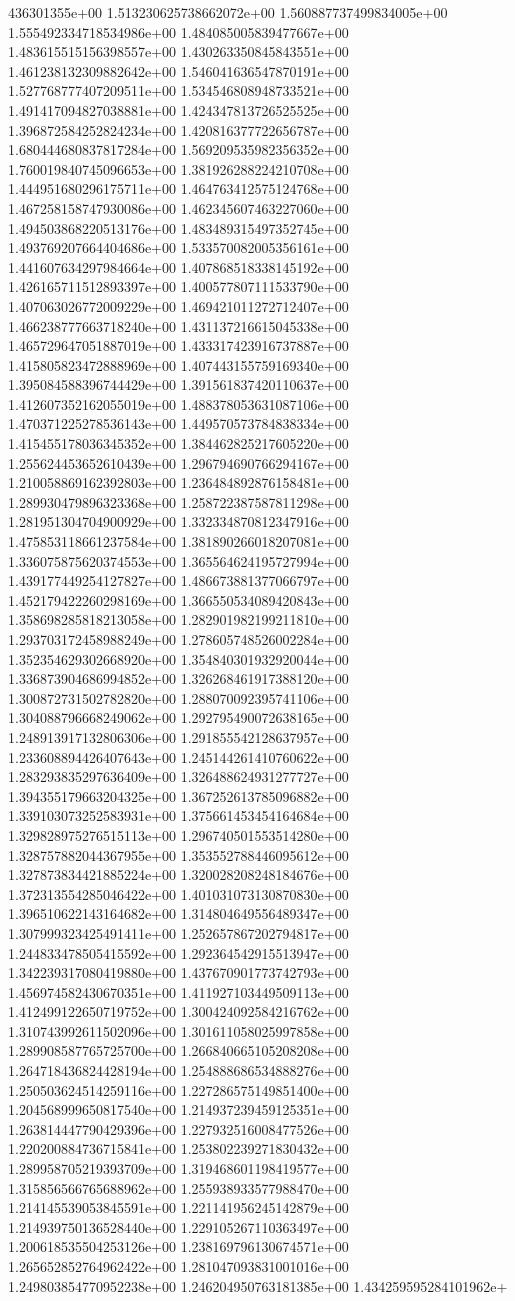 436301355e+00	1.513230625738662072e+00	1.560887737499834005e+00	1.555492334718534986e+00	1.484085005839477667e+00	1.483615515156398557e+00	1.430263350845843551e+00	1.461238132309882642e+00	1.546041636547870191e+00	1.527768777407209511e+00	1.534546808948733521e+00	1.491417094827038881e+00	1.424347813726525525e+00	1.396872584252824234e+00	1.420816377722656787e+00	1.680444680837817284e+00	1.569209535982356352e+00	1.760019840745096653e+00	1.381926288224210708e+00	1.444951680296175711e+00	1.464763412575124768e+00	1.467258158747930086e+00	1.462345607463227060e+00	1.494503868220513176e+00	1.483489315497352745e+00	1.493769207664404686e+00	1.533570082005356161e+00	1.441607634297984664e+00	1.407868518338145192e+00	1.426165711512893397e+00	1.400577807111533790e+00	1.407063026772009229e+00	1.469421011272712407e+00	1.466238777663718240e+00	1.431137216615045338e+00	1.465729647051887019e+00	1.433317423916737887e+00	1.415805823472888969e+00	1.407443155759169340e+00	1.395084588396744429e+00	1.391561837420110637e+00	1.412607352162055019e+00	1.488378053631087106e+00	1.470371225278536143e+00	1.449570573784838334e+00	1.415455178036345352e+00	1.384462825217605220e+00	1.255624453652610439e+00	1.296794690766294167e+00	1.210058869162392803e+00	1.236484892876158481e+00	1.289930479896323368e+00	1.258722387587811298e+00	1.281951304704900929e+00	1.332334870812347916e+00	1.475853118661237584e+00	1.381890266018207081e+00	1.336075875620374553e+00	1.365564624195727994e+00	1.439177449254127827e+00	1.486673881377066797e+00	1.452179422260298169e+00	1.366550534089420843e+00	1.358698285818213058e+00	1.282901982199211810e+00	1.293703172458988249e+00	1.278605748526002284e+00	1.352354629302668920e+00	1.354840301932920044e+00	1.336873904686994852e+00	1.326268461917388120e+00	1.300872731502782820e+00	1.288070092395741106e+00	1.304088796668249062e+00	1.292795490072638165e+00	1.248913917132806306e+00	1.291855542128637957e+00	1.233608894426407643e+00	1.245144261410760622e+00	1.283293835297636409e+00	1.326488624931277727e+00	1.394355179663204325e+00	1.367252613785096882e+00	1.339103073252583931e+00	1.375661453454164684e+00	1.329828975276515113e+00	1.296740501553514280e+00	1.328757882044367955e+00	1.353552788446095612e+00	1.327873834421885224e+00	1.320028208248184676e+00	1.372313554285046422e+00	1.401031073130870830e+00	1.396510622143164682e+00	1.314804649556489347e+00	1.307999323425491411e+00	1.252657867202794817e+00	1.244833478505415592e+00	1.292364542915513947e+00	1.342239317080419880e+00	1.437670901773742793e+00	1.456974582430670351e+00	1.411927103449509113e+00	1.412499122650719752e+00	1.300424092584216762e+00	1.310743992611502096e+00	1.301611058025997858e+00	1.289908587765725700e+00	1.266840665105208208e+00	1.264718436824428194e+00	1.254888686534888276e+00	1.250503624514259116e+00	1.227286575149851400e+00	1.204568999650817540e+00	1.214937239459125351e+00	1.263814447790429396e+00	1.227932516008477526e+00	1.220200884736715841e+00	1.253802239271830432e+00	1.289958705219393709e+00	1.319468601198419577e+00	1.315856566765688962e+00	1.255938933577988470e+00	1.214145539053845591e+00	1.221141956245142879e+00	1.214939750136528440e+00	1.229105267110363497e+00	1.200618535504253126e+00	1.238169796130674571e+00	1.265652852764962422e+00	1.281047093831001016e+00	1.249803854770952238e+00	1.246204950763181385e+00	1.434259595284101962e+